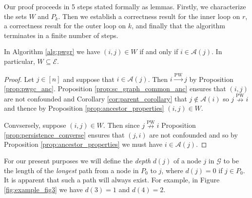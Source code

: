 \documentclass[12pt]{article}
\def\pwgc{\overset{\text{PW}}{\rightarrow}}  %
\def\npwgc{\overset{\text{PW}}{\nrightarrow}}  %
\def\gcg{\mathcal{G}}  %
\def\gcge{\mathcal{E}}  %
\newcommand{\anc}[1]{\mathcal{A}(#1)}  %
\begin{document}


Our proof proceeds in 5 steps stated formally as lemmas.  Firstly, we
characterize the sets $W$ and $P_k$.  Then we establish a correctness
result for the inner loop on $r$, a correctness result for the outer
loop on $k$, and finally that the algorithm terminates in a finite
number of steps.

\begin{lemma}
  \label{lem:W_subset_E}
  In Algorithm \ref{alg:pwgr} we have
  $(i, j) \in W$ if and only if $i \in \anc{j}$.  In particular,
  $W \subseteq \gcge$.
\end{lemma}
\begin{proof}
  Let $j \in [n]$ and suppose that $i \in \anc{j}$.  Then $i \pwgc j$
  by Proposition \ref{prop:pwgc_anc}.  Proposition
  \ref{prop:sc_graph_common_anc} ensures that $(i, j)$ are not
  confounded and Corollary \ref{cor:parent_corollary} that
  $j \not\in \anc{i}$ so $j \npwgc i$ and thence by Proposition
  \ref{prop:ancestor_properties} $(i, j) \in W$.

  Convsersely, suppose $(i, j) \in W$.  Then since $j \npwgc i$
  Proposition \ref{prop:persistence_converse} ensures that $(j, i)$
  are not confounded and so by Proposition \ref{prop:ancestor_properties}
  we must have $i \in \anc{j}$.
\end{proof}

\begin{definition}[Depth]
  For our present purposes we will define the \textit{depth} $d(j)$ of
  a node $j$ in $\gcg$ to be the length of the \textit{longest} path
  from a node in $P_0$ to $j$, where $d(j) = 0$ if $j \in P_0$.  It is
  apparent that such a path will always exist.  For example, in Figure
  \ref{fig:example_fig3} we have $d(3) = 1$ and $d(4) = 2$.
\end{definition}
\end{document}
